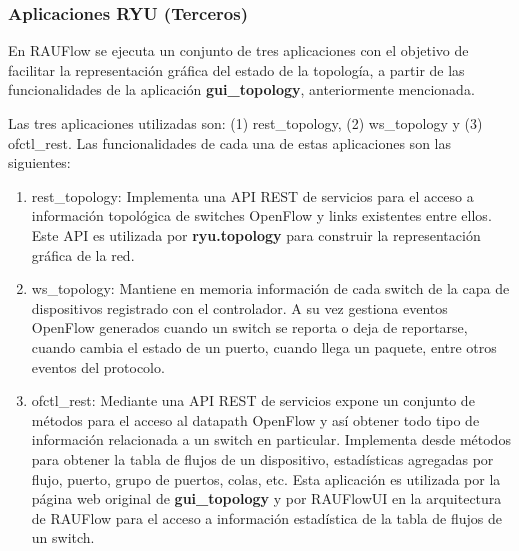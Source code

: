 
\subsubsection{Aplicaciones RYU (Terceros)}
En RAUFlow se ejecuta un conjunto de tres aplicaciones con el objetivo de facilitar la representaci\'on gr\'afica del estado de la topolog\'ia, a partir de las funcionalidades de la aplicación \textbf{gui\_topology}, anteriormente mencionada. 

Las tres aplicaciones utilizadas son:
(1) rest\_topology, (2) ws\_topology y (3) ofctl\_rest. Las funcionalidades de cada una de estas aplicaciones son las siguientes:

\begin{enumerate}
\item rest\_topology: Implementa una API REST de servicios para el acceso a informaci\'on topol\'ogica de switches OpenFlow y links existentes entre ellos. Este API es utilizada por \textbf{ryu.topology} para construir la representaci\'on gr\'afica de la red.

\item ws\_topology: Mantiene en memoria informaci\'on de cada switch de la capa de dispositivos registrado con el controlador. A su vez gestiona eventos OpenFlow generados cuando un switch se reporta o deja de reportarse, cuando cambia el estado de un puerto, cuando llega un paquete, entre otros eventos del protocolo.

\item ofctl\_rest: Mediante una API REST de servicios expone un conjunto de m\'etodos para el acceso al datapath OpenFlow y as\'i obtener todo tipo de informaci\'on relacionada a un switch en particular. Implementa desde m\'etodos para obtener la tabla de flujos de un dispositivo, estadísticas agregadas por flujo, puerto, grupo de puertos, colas, etc. Esta aplicaci\'on es utilizada por la p\'agina web original de \textbf{gui\_topology} y por RAUFlowUI en la arquitectura de RAUFlow para el acceso a informaci\'on estad\'istica de la tabla de flujos de un switch.

\end{enumerate}

